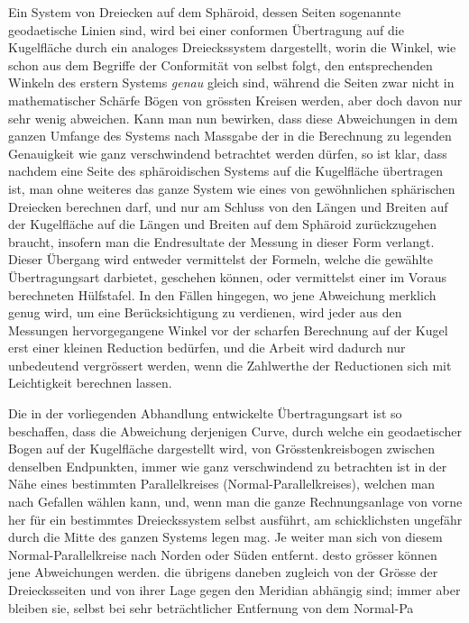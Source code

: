 %
\par\indent Ein System von Dreiecken auf dem Sphäroid, dessen Seiten sogenannte geodaetische Linien sind, wird bei einer conformen Übertragung auf die Kugelfläche durch ein analoges Dreieckssystem dargestellt, worin die Winkel, wie schon aus dem Begriffe der Conformität von selbst folgt, den entsprechenden Winkeln des erstern Systems \textit{genau} gleich sind, während die Seiten zwar nicht in mathematischer Schärfe Bögen von grössten Kreisen werden, aber doch davon nur sehr wenig abweichen. Kann man nun bewirken, dass diese Abweichungen in dem ganzen Umfange des Systems nach Massgabe der in die Berechnung zu legenden Genauigkeit wie ganz verschwindend betrachtet werden dürfen, so ist klar, dass nachdem eine Seite des sphäroidischen Systems auf die Kugelfläche übertragen ist, man ohne weiteres das ganze System wie eines von gewöhnlichen sphärischen Dreiecken berechnen darf, und nur am Schluss von den Längen und Breiten auf der Kugelfläche auf die Längen und Breiten auf dem Sphäroid zurückzugehen braucht, insofern man die Endresultate der Messung in dieser Form verlangt. Dieser Übergang wird entweder vermittelst der Formeln, welche die gewählte Übertragungsart darbietet, geschehen können, oder vermittelst einer im Voraus berechneten Hülfstafel. In den Fällen hingegen, wo jene Abweichung merklich genug wird, um eine Berücksichtigung zu verdienen, wird jeder aus den Messungen hervorgegangene Winkel vor der scharfen Berechnung auf der Kugel erst einer kleinen Reduction bedürfen, und die Arbeit wird dadurch nur unbedeutend vergrössert werden, wenn die Zahlwerthe der Reductionen sich mit Leichtigkeit berechnen lassen.

Die in der vorliegenden Abhandlung entwickelte Übertragungsart ist so beschaffen, dass die Abweichung derjenigen Curve, durch welche ein geodaetischer Bogen auf der Kugelfläche dargestellt wird, von Grösstenkreisbogen zwischen denselben Endpunkten, immer wie ganz verschwindend zu betrachten ist in der Nähe eines bestimmten Parallelkreises (Normal-Parallelkreises), welchen man nach Gefallen wählen kann, und, wenn man die ganze Rechnungsanlage von vorne her für ein bestimmtes Dreieckssystem selbst ausführt, am schicklichsten ungefähr durch die Mitte des ganzen Systems legen mag. Je weiter man sich von diesem Normal-Parallelkreise nach Norden oder Süden entfernt. desto grösser können jene Abweichungen werden. die übrigens daneben zugleich von der Grösse der Dreiecksseiten und von ihrer Lage gegen den Meridian abhängig sind; immer aber bleiben sie, selbst bei sehr beträchtlicher Entfernung von dem Normal-Pa%
